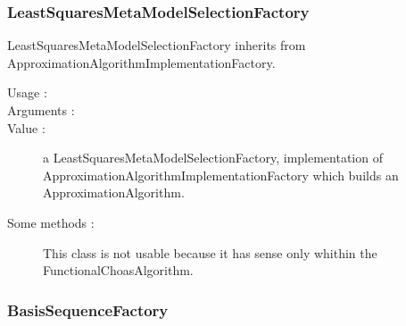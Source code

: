 \newpage\subsubsection{LeastSquaresMetaModelSelectionFactory}

      LeastSquaresMetaModelSelectionFactory inherits from ApproximationAlgorithmImplementationFactory.

      \begin{description}
         \item[Usage :] \rule{0pt}{1em}

         \item[Arguments :] \rule{0pt}{1em}

         \item[Value :] a LeastSquaresMetaModelSelectionFactory, implementation of ApproximationAlgorithmImplementationFactory which builds an ApproximationAlgorithm.

         \item[Some methods :]  This class is not usable because it has sense only whithin the FunctionalChoasAlgorithm.

      \end{description}


\newpage \subsubsection{BasisSequenceFactory}

